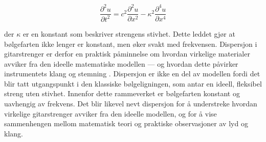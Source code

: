 \begin{equation*}
\frac{\partial^2 u}{\partial t^2} = c^2 \frac{\partial^2 u}{\partial x^2} - \kappa^2 \frac{\partial^4 u}{\partial x^4}
\end{equation*}

der $\kappa$ er en konstant som beskriver strengens stivhet.  
Dette leddet gjør at bølgefarten ikke lenger er konstant, men øker svakt med frekvensen.  
Dispersjon i gitarstrenger er derfor en praktisk påminnelse om hvordan virkelige materialer avviker fra den ideelle matematiske modellen — og hvordan dette påvirker instrumentets klang og stemning \parencite{kartofelev2019dispersive, unswStringsHarmonics, wikipediaInharmonicity}.
\clearpage
Dispersjon er ikke en del av modellen fordi det blir tatt utgangspunkt i den klassiske bølgeligningen, som antar en ideell, fleksibel streng uten stivhet.
Innenfor dette rammeverket er bølgefarten konstant og uavhengig av frekvens.
Det blir likevel nevt dispersjon for å understreke hvordan virkelige gitarstrenger avviker fra den ideelle modellen, og for å vise sammenhengen mellom matematisk teori og praktiske observasjoner av lyd og klang.

